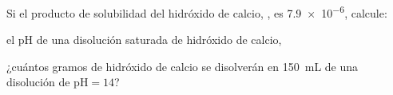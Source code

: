 Si el producto de solubilidad del hidróxido de calcio, , es \num{7,9e-6}, calcule:\quad
	\begin{enumerate*}[label={\alph*)},font=\bfseries]
		\item el $\mathrm{pH}$ de una disolución saturada de hidróxido de calcio,
		\item ¿cuántos gramos de hidróxido de calcio se disolverán en \SI{150}{\milli\liter} de una disolución de $\mathrm{pH} = \num{14}$?
	\end{enumerate*}

